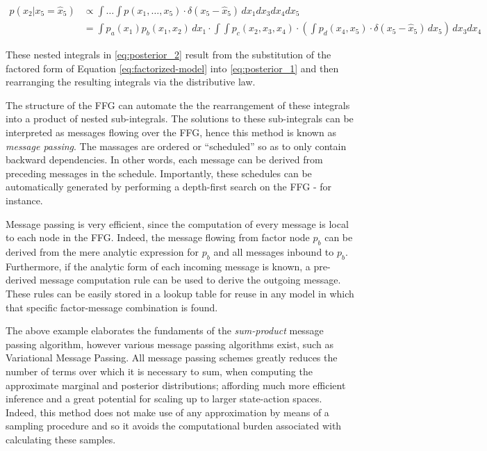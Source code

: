 \documentclass[onecolumn]{IEEEtran}
\begin{document}
\begin{align}
	p(x_2 | x_5 = \hat{x}_5) &\propto \int \dots \int p(x_1, \dots, x_5) \cdot \delta(x_5 - \hat{x}_5) \, dx_1 dx_3 dx_4 dx_5 \label{eq:posterior_1} \\
	&= \int p_a(x_1) p_b(x_1, x_2) \, dx_1 \cdot \int\int p_c(x_2, x_3, x_4) \cdot \left(\int p_d(x_4, x_5) \cdot \delta(x_5 - \hat{x}_5) \, dx_5 \right) \, dx_3 dx_4 \label{eq:posterior_2}
\end{align}


These nested integrals in \eqref{eq:posterior_2} result from the substitution of the factored form of Equation \ref{eq:factorized-model} into \eqref{eq:posterior_1} and then rearranging the resulting integrals via the distributive law.

The structure of the FFG can automate the the rearrangement of these integrals into a product of nested sub-integrals. The solutions to these sub-integrals can be interpreted as messages flowing over the FFG, hence this method is known as \textit{message passing}. The massages are ordered or ``scheduled'' so as to only contain backward dependencies. In other words, each message can be derived from preceding messages in the schedule. Importantly, these schedules can be automatically generated by performing a depth-first search on the FFG - for instance. 

Message passing is very efficient, since the computation of every message is local to each node in the FFG. Indeed, the message flowing from factor node $p_b$ can be derived from the mere analytic expression for $p_b$ and all messages inbound to $p_b$. Furthermore, if the analytic form of each incoming message is known, a pre-derived message computation rule can be used to derive the outgoing message. These rules can be easily stored in a lookup table for reuse in any model in which that specific factor-message combination is found. 

The above example elaborates the fundaments of the \textit{sum-product} message passing algorithm, however various message passing algorithms exist, such as Variational Message Passing. All message passing schemes greatly reduces the number of terms over which it is necessary to sum, when computing the approximate marginal and posterior distributions; affording much more efficient inference and a great potential for scaling up to larger state-action spaces. Indeed, this method does not make use of any approximation by means of a sampling procedure and so it avoids the computational burden associated with calculating these samples. 
\end{document}
